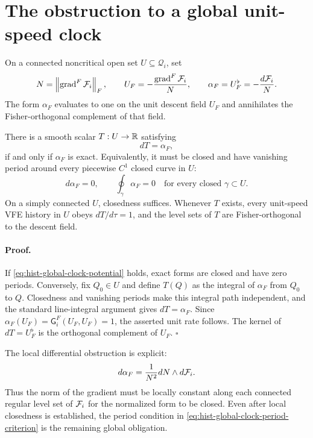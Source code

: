 \section{The obstruction to a global unit-speed clock}
\label{sec:hist-global-clock}

On a connected noncritical open set $U\subseteq\mathcal Q_i$, set
\begin{equation}
N=\left\|\operatorname{grad}^F\mathcal F_i\right\|_F,
\qquad
U_F=-\frac{\operatorname{grad}^F\mathcal F_i}{N},
\qquad
\alpha_F=U_F^\flat=-\frac{d\mathcal F_i}{N}.
\label{eq:hist-normalized-vfe-one-form}
\end{equation}
The form $\alpha_F$ evaluates to one on the unit descent field $U_F$ and
annihilates the Fisher-orthogonal complement of that field.

There is a smooth scalar $T:U\to\mathbb R$ satisfying
\begin{equation}
dT=\alpha_F,
\label{eq:hist-global-clock-potential}
\end{equation}
if and only if $\alpha_F$ is exact.  Equivalently, it must be closed and have
vanishing period around every piecewise $C^1$ closed curve in $U$:
\begin{equation}
d\alpha_F=0,
\qquad
\oint_\gamma\alpha_F=0
\quad\text{for every closed }\gamma\subset U.
\label{eq:hist-global-clock-period-criterion}
\end{equation}
On a simply connected $U$, closedness suffices.  Whenever $T$ exists, every
unit-speed VFE history in $U$ obeys $dT/d\tau=1$, and the level sets of $T$
are Fisher-orthogonal to the descent field.  

\paragraph{Proof.}
If \eqref{eq:hist-global-clock-potential} holds, exact forms are closed and
have zero periods.  Conversely, fix $Q_0\in U$ and define $T(Q)$ as the
integral of $\alpha_F$ from $Q_0$ to $Q$.  Closedness and vanishing periods
make this integral path independent, and the standard line-integral argument
gives $dT=\alpha_F$.  Since
$\alpha_F(U_F)=\mathsf G_i^F(U_F,U_F)=1$, the asserted unit rate follows.
The kernel of $dT=U_F^\flat$ is the orthogonal complement of $U_F$.
$\square$

The local differential obstruction is explicit:
\begin{equation}
d\alpha_F
=\frac{1}{N^2}dN\wedge d\mathcal F_i.
\label{eq:hist-normalized-form-curvature}
\end{equation}
Thus the norm of the gradient must be locally constant along each connected
regular level set of $\mathcal F_i$ for the normalized form to be closed.
Even after local closedness is established, the period condition in
\eqref{eq:hist-global-clock-period-criterion} is the remaining global
obligation.  

